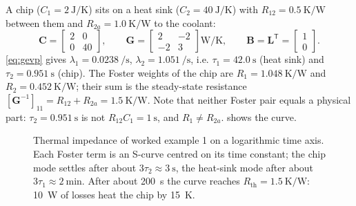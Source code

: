 \documentclass[11pt,a4paper]{article}
\newcommand{\Rth}{R_{\mathrm{th}}}
\newcommand{\Zth}{Z_{\mathrm{th}}}
\newcommand{\T}{^{\mathsf T}}
\newcommand{\mat}[1]{\bm{#1}}
\begin{document}
\begin{examplebox}
A chip ($C_1=\SI{2}{\joule\per\kelvin}$) sits on a heat sink ($C_2=\SI{40}{\joule\per\kelvin}$) with
$R_{12}=\SI{0.5}{\kelvin\per\watt}$ between them and $R_{2a}=\SI{1.0}{\kelvin\per\watt}$ to the coolant:
\[
  \mat C = \begin{bmatrix}2&0\\0&40\end{bmatrix},\qquad
  \mat G = \begin{bmatrix}2&-2\\-2&3\end{bmatrix}\si{\watt\per\kelvin},\qquad \mat B = \mat L\T =
  \begin{bmatrix}1\\0\end{bmatrix}.
\]
\eqref{eq:gevp} gives $\lambda_1=\SI{0.0238}{\per\second}$, $\lambda_2=\SI{1.051}{\per\second}$, i.e.
$\tau_1=\SI{42.0}{\second}$ (heat sink) and $\tau_2=\SI{0.951}{\second}$ (chip). The Foster weights of the chip are
$R_1=\SI{1.048}{\kelvin\per\watt}$ and $R_2=\SI{0.452}{\kelvin\per\watt}$; their sum is the steady-state resistance
$[\mat G^{-1}]_{11}=R_{12}+R_{2a}=\SI{1.5}{\kelvin\per\watt}$. Note that neither Foster pair equals a physical part:
$\tau_2=\SI{0.951}{\second}$ is not $R_{12}C_1=\SI{1}{\second}$, and $R_1\neq R_{2a}$.  shows the curve.
\end{examplebox}

\begin{figure}[h]\centering
{}
\caption{Thermal impedance of worked example 1 on a logarithmic time axis. Each Foster term is an S-curve centred on
its time constant; the chip mode settles after about $3\tau_2\approx\SI{3}{\second}$, the heat-sink mode after about
$3\tau_1\approx\SI{2}{\minute}$. After about \SI{200}{\second} the curve reaches $\Rth=\SI{1.5}{\kelvin\per\watt}$:
\SI{10}{\watt} of losses heat the chip by \SI{15}{\kelvin}.}
\label{fig:zth}
\end{figure}
\end{document}
